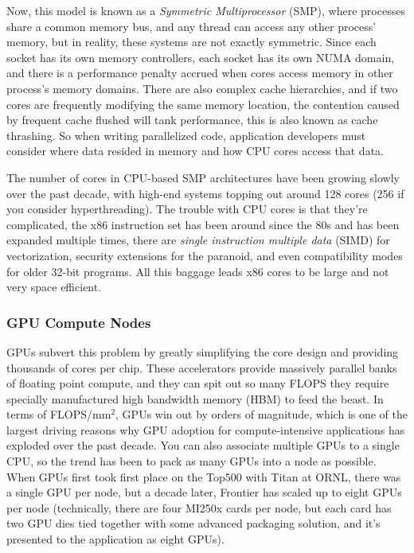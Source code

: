 Now, this model is known as a \textit{Symmetric Multiprocessor} (SMP), where processes share a common memory bus, and any thread can access any other process' memory, but in reality, these systems are not exactly symmetric. 
Since each socket has its own memory controllers, each socket has its own NUMA domain, and there is a performance penalty accrued when cores access memory in other process's memory domains.
There are also complex cache hierarchies, and if two cores are frequently modifying the same memory location, the contention caused by frequent cache flushed will tank performance, this is also known as cache thrashing.
So when writing parallelized code, application developers must consider where data resided in memory and how CPU cores access that data.
 
The number of cores in CPU-based SMP architectures have been growing slowly over the past decade, with high-end systems topping out around 128 cores (256 if you consider hyperthreading).
The trouble with CPU cores is that they're complicated, the x86 instruction set has been around since the 80s and has been expanded multiple times, there are \textit{single instruction multiple data} (SIMD) for vectorization, security extensions for the paranoid, and even compatibility modes for older 32-bit programs. 
All this baggage leads x86 cores to be large and not very space efficient. 

\subsubsection{GPU Compute Nodes}
GPUs subvert this problem by greatly simplifying the core design and providing thousands of cores per chip. 
These accelerators provide massively parallel banks of floating point compute, and they can spit out so many FLOPS they require specially manufactured high bandwidth memory (HBM) to feed the beast.
In terms of FLOPS/mm$^2$, GPUs win out by orders of magnitude, which is one of the largest driving reasons why GPU adoption for compute-intensive applications has exploded over the past decade.
You can also associate multiple GPUs to a single CPU, so the trend has been to pack as many GPUs into a node as possible.
When GPUs first took first place on the Top500 with Titan at ORNL, there was a single GPU per node, but a decade later, Frontier has scaled up to eight GPUs per node (technically, there are four MI250x cards per node, but each card has two GPU dies tied together with some advanced packaging solution, and it's presented to the application as eight GPUs).

